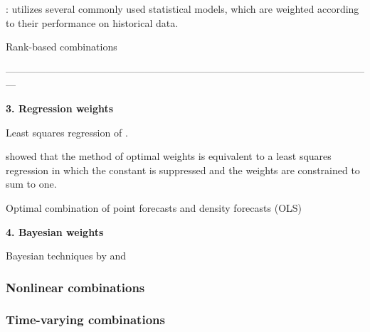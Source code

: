 \documentclass[11pt]{article}
\begin{document}
\cite{Pawlikowski2020-hm}: utilizes several commonly used statistical models, which are weighted according to their performance on historical data.

Rank-based combinations
 
{\color{blue} ---------------------------------------------------------------------------------------------------------------}
 


{\bf{3. Regression weights}}

Least squares regression of \cite{Granger1984-jc}.


\cite{Granger1984-jc} showed that the method of optimal weights \citep{Bates1969-yj,Newbold1974-lp} is equivalent to a least squares regression in which the constant is suppressed and the weights are constrained to sum to one.

\cite{Genre2013-ut} 

\cite{Conflitti2015-fq} Optimal combination of point forecasts and density forecasts (OLS)

{\bf{4. Bayesian weights}}

Bayesian techniques by \cite{Bunn1975-mg} and \cite{Clemen1993-ey}




\subsubsection{Nonlinear combinations}

\subsubsection{Time-varying combinations}

\end{document}
